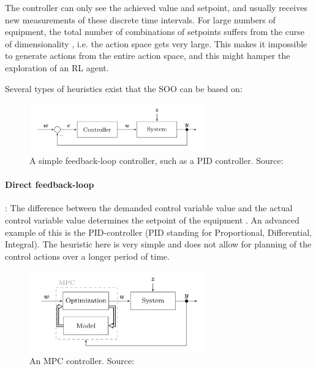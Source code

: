 \documentclass{article}
\theoremstyle{definition}
\theoremstyle{remark}
\begin{document}
The controller can only see the achieved value and setpoint, and usually receives new measurements of these discrete time intervals. For large numbers of equipment, the total number of combinations of setpoints suffers from the curse of dimensionality \cite{luo2022controlling}, i.e. the action space gets very large. This makes it impossible to generate actions from the entire action space, and this might hamper the exploration of an RL agent.

\FloatBarrier
Several types of heuristics exist that the SOO can be based on:


\begin{figure}
    \centering
    \includegraphics[width=3in]{feedbackloop.png}
    \caption{A simple feedback-loop controller, such as a PID controller. Source: \cite{Schwenzer_Ay_Bergs_Abel_2021}}
    \label{fig:simplefeedback}
\end{figure}


\paragraph{Direct feedback-loop}: The difference between the demanded control variable value and the actual control variable value determines the setpoint of the equipment \cite{Schwenzer_Ay_Bergs_Abel_2021}. An advanced example of this is the PID-controller (PID standing for Proportional, Differential, Integral). The heuristic here is very simple and does not allow for planning of the control actions over a longer period of time.



\begin{figure}
    \centering
    \includegraphics[width=3in]{mpc.png}
    \caption{An MPC controller. Source: \cite{Schwenzer_Ay_Bergs_Abel_2021}}
    \label{fig:mpc}
\end{figure}
\end{document}
